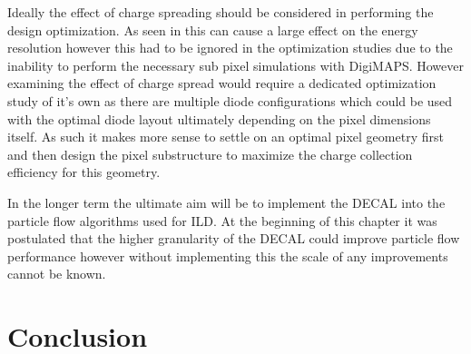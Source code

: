 Ideally the effect of charge spreading should be considered in performing the design optimization. As seen in  this can cause a large effect on the energy resolution however this had to be ignored in the optimization studies due to the inability to perform the necessary sub pixel simulations with DigiMAPS. However examining the effect of charge spread would require a dedicated optimization study of it's own as there are multiple diode configurations which could be used with the optimal diode layout ultimately depending on the pixel dimensions itself. As such it makes more sense to settle on an optimal pixel geometry first and then design the pixel substructure to maximize the charge collection efficiency for this geometry.

In the longer term the ultimate aim will be to implement the \ac{DECAL} into the particle flow algorithms used for \ac{ILD}. At the beginning of this chapter it was postulated that the higher granularity of the \ac{DECAL} could improve particle flow performance however without implementing this the scale of any improvements cannot be known.



\section{Conclusion}

